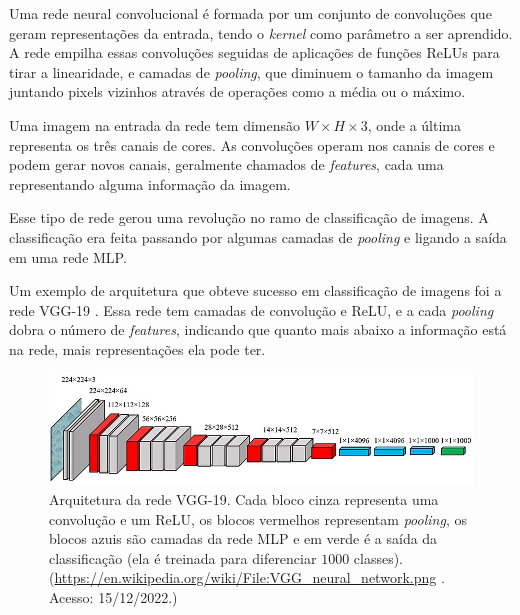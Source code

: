 
Uma rede neural convolucional é formada
por um conjunto de convoluções que
geram representações da entrada, 
tendo o \textit{kernel} como parâmetro a ser aprendido.
A rede empilha essas convoluções seguidas
de aplicações de funções ReLUs para tirar
a linearidade, e camadas de \textit{pooling},
que diminuem o tamanho da imagem
juntando pixels vizinhos através de
operações como a média ou o máximo.


Uma imagem na entrada da rede tem 
dimensão $W\times H \times 3$,
onde a última representa os três
canais de cores.
As convoluções operam nos canais
de cores e podem gerar novos canais,
geralmente chamados de \textit{features},
cada uma representando alguma informação
da imagem.


Esse tipo de rede gerou uma revolução
no ramo de classificação de imagens.
A classificação era feita passando
por algumas camadas de \textit{pooling} e
ligando a saída em uma rede MLP.

Um exemplo de arquitetura que obteve
sucesso em classificação de imagens
foi a rede VGG-19 \cite{Simonyan2014}. Essa rede 
tem camadas de convolução e ReLU,
e a cada \textit{pooling} dobra o número
de \textit{features}, indicando que quanto
mais abaixo a informação está na rede,
mais representações ela pode ter.

\begin{figure}[!ht]
	\centering
	\includegraphics[width=\linewidth*5/6]{files/assets/deeplearning/vgg19.png}
	\caption{Arquitetura da rede VGG-19. Cada bloco cinza representa
	uma convolução e um ReLU, os blocos vermelhos representam 
	\textit{pooling}, os blocos azuis são camadas da rede MLP e em verde é a
	saída da classificação (ela é treinada para diferenciar $1000$
	classes).
	(\url{https://en.wikipedia.org/wiki/File:VGG_neural_network.png}
	. Acesso: 15/12/2022.)}
	\label{img:preview}
\end{figure}


